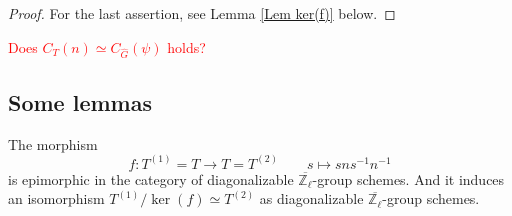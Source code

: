 \begin{proof}
	

    For the last assertion, see Lemma \ref{Lem ker(f)} below.
	
\end{proof}

\textcolor{red}{Does $C_T(n) \simeq C_{\hat{G}}(\psi)$ holds?}

\subsection{Some lemmas}

\begin{lemma}\label{Lem epic}
	The morphism 
	$$f: T^{(1)} = T \longrightarrow T = T^{(2)} \qquad s \longmapsto sns^{-1}n^{-1}$$
	is epimorphic in the category of diagonalizable $\overline{\mathbb{Z}_{\ell}}$-group schemes. And it induces an isomorphism $T^{(1)}/\ker(f) \simeq T^{(2)}$ as diagonalizable $\overline{\mathbb{Z}_{\ell}}$-group schemes.
\end{lemma}

